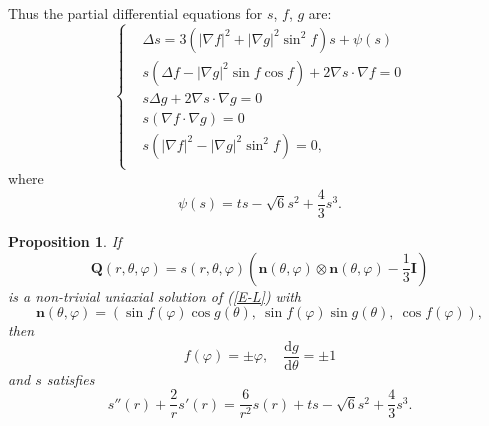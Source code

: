 \documentclass[10pt, a4paper]{article}
\newtheorem{proposition}{Proposition}[section]
\newcommand\dd{\mathrm{d}}
\newcommand\n{\mathbf{n}}
\newcommand\Qvec{\mathbf{Q}}
\newcommand\pp{\partial}
\begin{document}
Thus the partial differential equations for $s$, $f$, $g$ are:
\begin{equation}\label{s_f_g}
\begin{cases}
&  \Delta s = 3 \left( |\nabla f|^2 + |\nabla g|^2 \sin^2 f \right) s + \psi(s)  \\
& s \left( \Delta f - |\nabla g|^2 \sin f \cos f \right) + 2 \nabla s \cdot \nabla f = 0 \\
& s \Delta g + 2 \nabla s \cdot \nabla g  = 0 \\
& s \left( \nabla f \cdot \nabla g \right) = 0 \\
& s \left( |\nabla f|^2 - |\nabla g|^2 \sin^2 f \right) = 0,  \\
\end{cases}
\end{equation}
where
\begin{equation}
\psi(s) = ts - \sqrt{6} s^2 + \frac{4}{3} s^3.
\end{equation}

\begin{proposition}
\label{prop:1} If 
\begin{equation}\label{Ansatz_1}
\Qvec(r, \theta, \varphi) = s(r, \theta, \varphi) \left( \n(\theta, \varphi) \otimes \n(\theta, \varphi) - \frac{1}{3} \mathbf{I} \right)
\end{equation}
is a non-trivial uniaxial solution of (\ref{E-L}) with
\begin{equation}\label{Ansatz_n}
 \n (\theta, \varphi) = \left( \sin f(\varphi) \cos g(\theta),~ \sin f(\varphi) \sin g(\theta),~ \cos f(\varphi) \right),
\end{equation}
then 
\begin{equation}
f(\varphi) = \pm \varphi, \quad \frac{\dd g}{\dd \theta}= \pm 1
\end{equation}
and $s$ satisfies
\begin{equation}\label{eq_h}
 s''(r) + \frac{2}{r} s'(r) = \frac{6}{r^2} s(r)  + ts - \sqrt{6} s^2 + \frac{4}{3} s^3. 
\end{equation}
\end{proposition}


\end{document}
